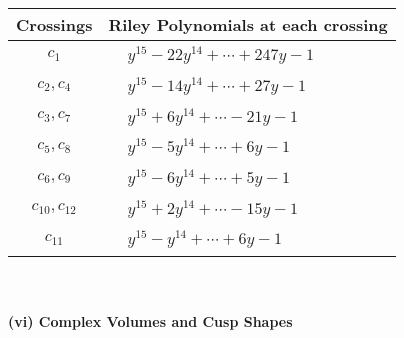 \documentclass[1p]{elsarticle_modified}
\theoremstyle{definition}
\begin{document}
\begin{tabular}{m{50pt}|m{274pt}}
Crossings & \hspace{64pt}Riley Polynomials at each crossing \\
\hline $$\begin{aligned}c_{1}\end{aligned}$$&$\begin{aligned}
&y^{15}-22 y^{14}+\cdots+247 y-1
\end{aligned}$\\
\hline $$\begin{aligned}c_{2},c_{4}\end{aligned}$$&$\begin{aligned}
&y^{15}-14 y^{14}+\cdots+27 y-1
\end{aligned}$\\
\hline $$\begin{aligned}c_{3},c_{7}\end{aligned}$$&$\begin{aligned}
&y^{15}+6 y^{14}+\cdots-21 y-1
\end{aligned}$\\
\hline $$\begin{aligned}c_{5},c_{8}\end{aligned}$$&$\begin{aligned}
&y^{15}-5 y^{14}+\cdots+6 y-1
\end{aligned}$\\
\hline $$\begin{aligned}c_{6},c_{9}\end{aligned}$$&$\begin{aligned}
&y^{15}-6 y^{14}+\cdots+5 y-1
\end{aligned}$\\
\hline $$\begin{aligned}c_{10},c_{12}\end{aligned}$$&$\begin{aligned}
&y^{15}+2 y^{14}+\cdots-15 y-1
\end{aligned}$\\
\hline $$\begin{aligned}c_{11}\end{aligned}$$&$\begin{aligned}
&y^{15}- y^{14}+\cdots+6 y-1
\end{aligned}$\\
\hline
\end{tabular}\\~\\
\newpage\flushleft \textbf{(vi) Complex Volumes and Cusp Shapes}
\end{document}

